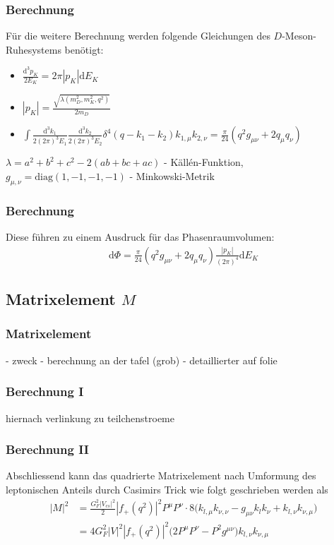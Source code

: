 \documentclass[hyperref={pdfpagelabels=false}]{beamer}
\begin{document}
\begin{frame}
 \frametitle{Berechnung}
 F\"ur die weitere Berechnung werden folgende Gleichungen des $D$-Meson-Ruhesystems ben\"otigt:
 \begin{itemize}
 \item $ \frac{\mathrm{d}^3p_K}{2E_K} = 2\pi |p_K|\mathrm{d}E_K$
   \item $|p_K| = \frac{\sqrt{\lambda(m_D^2, m_K^2, q^2)}}{2m_D}$
   \item $\int \frac{\mathrm{d}^3k_1}{2(2\pi)^3E_1} \frac{\mathrm{d}^3k_2}{2(2\pi)^3E_2}\delta^4(q-k_1-k_2)k_{1,\mu} k_{2,\nu} = \frac{\pi}{24}(q^2g_{\mu\nu} + 2q_\mu q_\nu)$
 \end{itemize}
 \vspace{0.7cm}
 \small{$\lambda = a^2+b^2+c^2-2(ab+bc+ac)$ - K\"all\'en-Funktion,\\$g_{\mu,\nu} = \text{diag}(1,-1,-1,-1)$ - Minkowski-Metrik}
\end{frame}

\begin{frame}
 \frametitle{Berechnung}
 Diese f\"uhren zu einem Ausdruck f\"ur das Phasenraumvolumen:
 \begin{align}
  \mathrm{d}\Phi = \frac{\pi}{24}(q^2g_{\mu\nu} + 2q_\mu q_\nu)\frac{|p_K|}{(2\pi)^4}\mathrm{d}E_K
  \label{eq_theoPhase}
 \end{align}
\end{frame}

\subsection{Matrixelement $M$}
\begin{frame}
\frametitle{Matrixelement}
- zweck
- berechnung an der tafel (grob)
- detaillierter auf folie
\end{frame}

\begin{frame}
 \frametitle{Berechnung I}
 hiernach verlinkung zu teilchenstroeme
\end{frame}

\begin{frame}
 \frametitle{Berechnung II}
 Abschliessend kann das quadrierte Matrixelement nach Umformung des leptonischen Anteils durch Casimirs Trick wie folgt geschrieben werden als
 \begin{align}
  |M|^2 & = \frac{G_F^2|V_{cs}|^2}{2}|f_+(q^2)|^2 P^\mu P^\nu \cdot 8\big(k_{l,\mu} k_{\nu,\nu} - g_{\mu\nu}k_lk_\nu + k_{l,\nu}k_{\nu,\mu}\big)\nonumber\\
  & = 4G_F^2|V|^2 |f_+(q^2)|^2 \big(2P^\mu P^\nu - P^2 g^{\mu\nu}\big) k_{l,\nu}k_{\nu,\mu}
  \label{eq_theoAmplitude}
 \end{align}
\end{frame}
\end{document}
